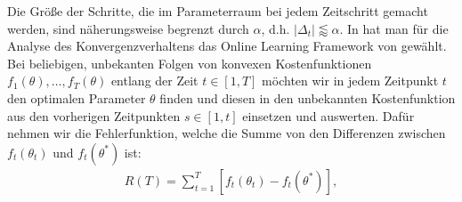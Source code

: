 \documentclass[12pt,titlepage,headsepline]{article}
\begin{document}
      Die Größe der Schritte, die im Parameterraum bei jedem Zeitschritt gemacht werden, sind näherungsweise begrenzt durch $\alpha$, d.h. $\lvert \Delta_t \rvert \lessapprox \alpha$. %
      \hfill\break
      In \cite{kingma_adam_2017} hat man für die Analyse des Konvergenzverhaltens das Online Learning Framework von \cite{zinkevich_online_2003} gewählt. Bei beliebigen, unbekanten Folgen von konvexen Kostenfunktionen $f_1(\theta),\ldots,f_T(\theta)$ entlang der Zeit $t\in [1,T]$ möchten wir in jedem Zeitpunkt $t$ den optimalen Parameter $\theta$ finden und diesen in den unbekannten Kostenfunktion aus den vorherigen Zeitpunkten $s \in [1,t]$ einsetzen und auswerten. Dafür nehmen wir die Fehlerfunktion, welche die Summe von den Differenzen zwischen $f_t(\theta_t)$ und $f_t(\theta^*)$ ist:
      \begin{align*}
        R(T) = \sum_{t=1}^T [f_t(\theta_t) - f_t(\theta^*)],
      \end{align*}
\end{document}

